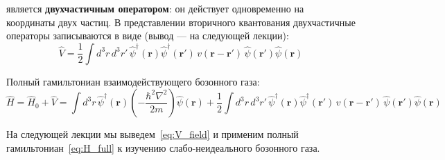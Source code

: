 \documentclass[../general/general]{subfiles}
\begin{document}
является \textbf{двухчастичным оператором}: он действует одновременно на координаты двух частиц. В представлении вторичного квантования двухчастичные операторы записываются в виде (вывод --- на следующей лекции):
\begin{equation}
    \hat{V} = \frac{1}{2}\int d^3r\,d^3r'\,\hat{\psi}^\dagger(\mathbf{r})\hat{\psi}^\dagger(\mathbf{r}')\,v(\mathbf{r}-\mathbf{r}')\,\hat{\psi}(\mathbf{r}')\hat{\psi}(\mathbf{r})
    \label{eq:V_field}
\end{equation}

Полный гамильтониан взаимодействующего бозонного газа:
\begin{equation}
    \hat{H} = \hat{H}_0 + \hat{V} = \int d^3r\,\hat{\psi}^\dagger(\mathbf{r})\!\left(-\frac{\hbar^2\nabla^2}{2m}\right)\hat{\psi}(\mathbf{r}) + \frac{1}{2}\int d^3r\,d^3r'\,\hat{\psi}^\dagger(\mathbf{r})\hat{\psi}^\dagger(\mathbf{r}')\,v(\mathbf{r}-\mathbf{r}')\,\hat{\psi}(\mathbf{r}')\hat{\psi}(\mathbf{r})
    \label{eq:H_full}
\end{equation}

На следующей лекции мы выведем~\eqref{eq:V_field} и применим полный гамильтониан~\eqref{eq:H_full} к изучению слабо-неидеального бозонного газа.

\end{document}
